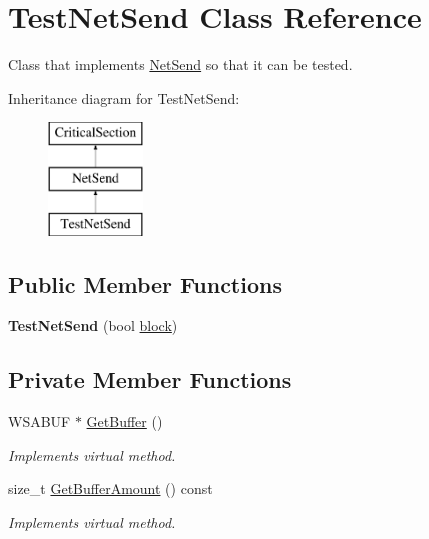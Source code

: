 \hypertarget{class_test_net_send}{
\section{TestNetSend Class Reference}
\label{class_test_net_send}
}


Class that implements \hyperlink{class_net_send}{NetSend} so that it can be tested.  


Inheritance diagram for TestNetSend:\begin{figure}[H]
\begin{center}
\leavevmode
\includegraphics[height=3.000000cm]{class_test_net_send}
\end{center}
\end{figure}
\subsection*{Public Member Functions}
\begin{DoxyCompactItemize}
\item 
\hypertarget{class_test_net_send_aad956dcbeaf4cb3cb5d3ee74fdea61bb}{
{\bfseries TestNetSend} (bool \hyperlink{class_net_send_afd9338a4ab3648178d0b5c816a0852d1}{block})}
\label{class_test_net_send_aad956dcbeaf4cb3cb5d3ee74fdea61bb}

\end{DoxyCompactItemize}
\subsection*{Private Member Functions}
\begin{DoxyCompactItemize}
\item 
WSABUF $\ast$ \hyperlink{class_test_net_send_a012f6748344143574dcb583ad44608d5}{GetBuffer} ()
\begin{DoxyCompactList}\small\item\em Implements virtual method. \item\end{DoxyCompactList}\item 
size\_\-t \hyperlink{class_test_net_send_a6da2fa870dc3003d17440c5acd994158}{GetBufferAmount} () const 
\begin{DoxyCompactList}\small\item\em Implements virtual method. \item\end{DoxyCompactList}\end{DoxyCompactItemize}


